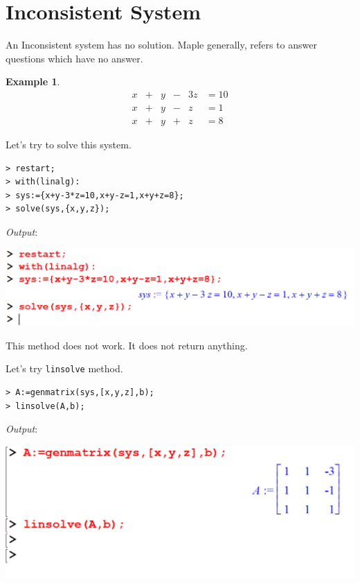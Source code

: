 \documentclass[
]{book}
\theoremstyle{definition}
\theoremstyle{definition}
\newtheorem{example}{Example}[chapter]
\theoremstyle{definition}
\theoremstyle{definition}
\theoremstyle{remark}
\begin{document}
\section{Inconsistent System}\label{inconsistent-system}

An Inconsistent system has no solution. Maple generally, refers to answer questions which have no answer.

\begin{example}
\protect\hypertarget{exm:unnamed-chunk-2}{}\label{exm:unnamed-chunk-2}\[
\begin{array}{ccccccccc}
x &+& y &-& 3z &= 10\\
x &+& y &-&  z &= 1\\
x &+& y &+&  z &= 8  
\end{array}
\]
\end{example}

Let's try to solve this system.

\begin{verbatim}
> restart;
> with(linalg):
> sys:={x+y-3*z=10,x+y-z=1,x+y+z=8};
> solve(sys,{x,y,z});
\end{verbatim}

\emph{Output}:

\includegraphics{figures/Lessson 5/fig11.png}

This method does not work. It does not return anything.

Let's try \texttt{linsolve} method.

\begin{verbatim}
> A:=genmatrix(sys,[x,y,z],b);
> linsolve(A,b);
\end{verbatim}

\emph{Output}:

\includegraphics{figures/Lessson 5/fig12.png}
\end{document}
